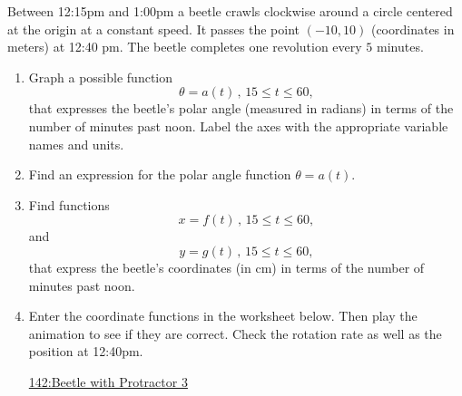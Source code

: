 \documentclass{ximera}
\begin{document}
\begin{question}  \label{QLDFsdfdsfdsfthgbbfg}
Between 12:15pm and 1:00pm a beetle crawls clockwise around a circle centered at the origin at a constant speed. It passes the point $(-10,10)$ (coordinates in meters) at 12:40 pm. The beetle completes one revolution every $5$ minutes.

\begin{enumerate}
\item Graph a possible function
\[
 \theta = a(t) \, , \, 15\leq t \leq 60 ,
\]
that expresses the beetle's polar angle (measured in radians) in terms of the number of minutes past noon. Label the axes with the appropriate variable names and units.

\item Find an expression for the polar angle function $\theta = a(t)$.

\item Find functions
\[
     x = f(t) \, , \, 15 \leq t \leq 60,
\]
and
\[
     y = g(t) \, , \, 15 \leq t \leq 60,
\]
that express the beetle's coordinates (in cm) in terms of the number of minutes past noon.

\item Enter the coordinate functions in the worksheet below. Then play the animation to see if they are correct. Check the rotation rate as well as the position at 12:40pm.

\begin{onlineOnly}
    \begin{center}
\end{center}
\end{onlineOnly}

\href{https://www.desmos.com/calculator/vqlcelbo1v}{142:Beetle with Protractor 3}


\end{enumerate}
\end{question}
\end{document}
